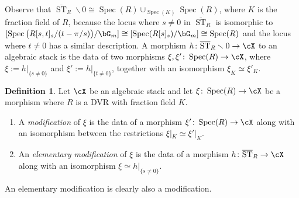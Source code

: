 \documentclass[a4paper]{amsart}
\numberwithin{equation}{section}
\theoremstyle{plain}
\theoremstyle{definition}
\newtheorem{defn}[thm]{Definition}
\DeclareMathOperator{\Spec}{Spec}
\DeclareMathOperator{\ST}{ST}
\newcommand{\co}{\colon}
\def\oST{\overline{\ST}}
\begin{document}
Observe that $\oST_R \smallsetminus 0 \cong \Spec(R) \cup_{\Spec(K)} \Spec(R)$, where $K$ is the fraction field of $R$, because the locus where $s \neq 0$ in $\oST_R$ is isomorphic to $[\Spec \big(R[s,t]_s/(t-\pi/s)\big) / \bG_m] \cong [\Spec(R[s]_s)/\bG_m] \cong \Spec(R)$ and the locus where $t \neq 0$ has a similar description. 
A morphism $h \co \oST_R \smallsetminus 0 \to \cX$ to an algebraic stack is the data of two morphisms $\xi,\xi' \co \Spec(R) \to \cX$, where $\xi := h|_{\{s \neq 0\}}$ and $\xi' := h|_{\{t\neq 0\}}$, together with an isomorphism $\xi_K \simeq \xi'_K$. 

\begin{defn} \label{D:elementary_mod} \label{D:modifications}
Let $\cX$ be an algebraic stack and let  $\xi\co \Spec(R) \to \cX$ be a morphism where $R$ is a DVR with fraction field $K$.
\begin{enumerate}
	\item A \emph{modification} of $\xi$ is the data of a morphism $\xi' \co \Spec(R) \to \cX$ along with an isomorphism between the restrictions $\xi|_K \simeq \xi'|_K$.
	\item An \emph{elementary modification} of $\xi$ is the data of a morphism $h \co \oST_{R} \to \cX$ along with an isomorphism $\xi \simeq h|_{\{s\neq 0\}}$.
\end{enumerate}
\end{defn}

An elementary modification is clearly also a modification.
\end{document}
